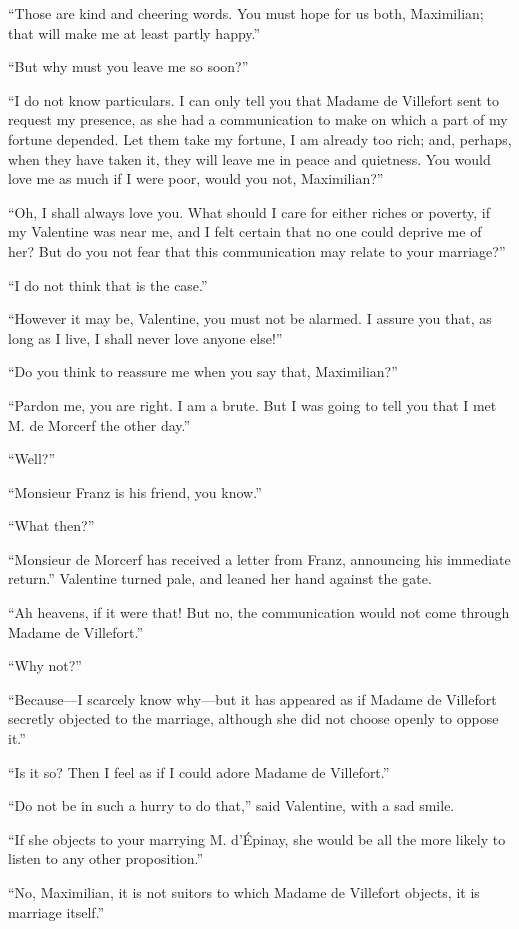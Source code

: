 “Those are kind and cheering words. You must hope for us both,
Maximilian; that will make me at least partly happy.”

“But why must you leave me so soon?”

“I do not know particulars. I can only tell you that Madame de
Villefort sent to request my presence, as she had a communication to
make on which a part of my fortune depended. Let them take my fortune,
I am already too rich; and, perhaps, when they have taken it, they will
leave me in peace and quietness. You would love me as much if I were
poor, would you not, Maximilian?”

“Oh, I shall always love you. What should I care for either riches or
poverty, if my Valentine was near me, and I felt certain that no one
could deprive me of her? But do you not fear that this communication
may relate to your marriage?”

“I do not think that is the case.”

“However it may be, Valentine, you must not be alarmed. I assure you
that, as long as I live, I shall never love anyone else!”

“Do you think to reassure me when you say that, Maximilian?”

“Pardon me, you are right. I am a brute. But I was going to tell you
that I met M. de Morcerf the other day.”

“Well?”

“Monsieur Franz is his friend, you know.”

“What then?”

“Monsieur de Morcerf has received a letter from Franz, announcing his
immediate return.” Valentine turned pale, and leaned her hand against
the gate.

“Ah heavens, if it were that! But no, the communication would not come
through Madame de Villefort.”

“Why not?”

“Because—I scarcely know why—but it has appeared as if Madame de
Villefort secretly objected to the marriage, although she did not
choose openly to oppose it.”

“Is it so? Then I feel as if I could adore Madame de Villefort.”

“Do not be in such a hurry to do that,” said Valentine, with a sad
smile.

“If she objects to your marrying M. d’Épinay, she would be all the more
likely to listen to any other proposition.”

“No, Maximilian, it is not suitors to which Madame de Villefort
objects, it is marriage itself.”

